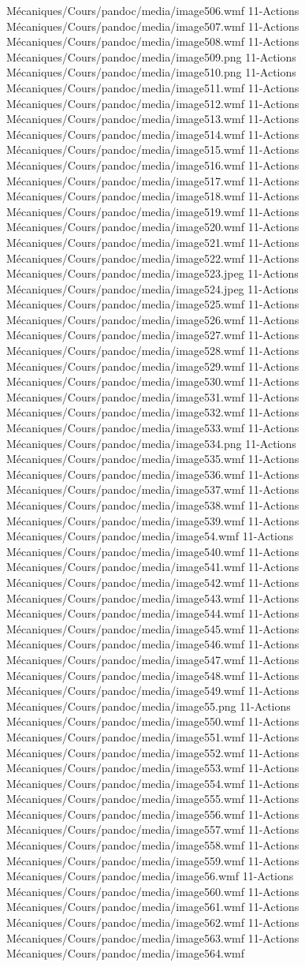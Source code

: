 Mécaniques/Cours/pandoc/media/image506.wmf 11-Actions Mécaniques/Cours/pandoc/media/image507.wmf 11-Actions Mécaniques/Cours/pandoc/media/image508.wmf 11-Actions Mécaniques/Cours/pandoc/media/image509.png 11-Actions Mécaniques/Cours/pandoc/media/image510.png 11-Actions Mécaniques/Cours/pandoc/media/image511.wmf 11-Actions Mécaniques/Cours/pandoc/media/image512.wmf 11-Actions Mécaniques/Cours/pandoc/media/image513.wmf 11-Actions Mécaniques/Cours/pandoc/media/image514.wmf 11-Actions Mécaniques/Cours/pandoc/media/image515.wmf 11-Actions Mécaniques/Cours/pandoc/media/image516.wmf 11-Actions Mécaniques/Cours/pandoc/media/image517.wmf 11-Actions Mécaniques/Cours/pandoc/media/image518.wmf 11-Actions Mécaniques/Cours/pandoc/media/image519.wmf 11-Actions Mécaniques/Cours/pandoc/media/image520.wmf 11-Actions Mécaniques/Cours/pandoc/media/image521.wmf 11-Actions Mécaniques/Cours/pandoc/media/image522.wmf 11-Actions Mécaniques/Cours/pandoc/media/image523.jpeg 11-Actions Mécaniques/Cours/pandoc/media/image524.jpeg 11-Actions Mécaniques/Cours/pandoc/media/image525.wmf 11-Actions Mécaniques/Cours/pandoc/media/image526.wmf 11-Actions Mécaniques/Cours/pandoc/media/image527.wmf 11-Actions Mécaniques/Cours/pandoc/media/image528.wmf 11-Actions Mécaniques/Cours/pandoc/media/image529.wmf 11-Actions Mécaniques/Cours/pandoc/media/image530.wmf 11-Actions Mécaniques/Cours/pandoc/media/image531.wmf 11-Actions Mécaniques/Cours/pandoc/media/image532.wmf 11-Actions Mécaniques/Cours/pandoc/media/image533.wmf 11-Actions Mécaniques/Cours/pandoc/media/image534.png 11-Actions Mécaniques/Cours/pandoc/media/image535.wmf 11-Actions Mécaniques/Cours/pandoc/media/image536.wmf 11-Actions Mécaniques/Cours/pandoc/media/image537.wmf 11-Actions Mécaniques/Cours/pandoc/media/image538.wmf 11-Actions Mécaniques/Cours/pandoc/media/image539.wmf 11-Actions Mécaniques/Cours/pandoc/media/image54.wmf 11-Actions Mécaniques/Cours/pandoc/media/image540.wmf 11-Actions Mécaniques/Cours/pandoc/media/image541.wmf 11-Actions Mécaniques/Cours/pandoc/media/image542.wmf 11-Actions Mécaniques/Cours/pandoc/media/image543.wmf 11-Actions Mécaniques/Cours/pandoc/media/image544.wmf 11-Actions Mécaniques/Cours/pandoc/media/image545.wmf 11-Actions Mécaniques/Cours/pandoc/media/image546.wmf 11-Actions Mécaniques/Cours/pandoc/media/image547.wmf 11-Actions Mécaniques/Cours/pandoc/media/image548.wmf 11-Actions Mécaniques/Cours/pandoc/media/image549.wmf 11-Actions Mécaniques/Cours/pandoc/media/image55.png 11-Actions Mécaniques/Cours/pandoc/media/image550.wmf 11-Actions Mécaniques/Cours/pandoc/media/image551.wmf 11-Actions Mécaniques/Cours/pandoc/media/image552.wmf 11-Actions Mécaniques/Cours/pandoc/media/image553.wmf 11-Actions Mécaniques/Cours/pandoc/media/image554.wmf 11-Actions Mécaniques/Cours/pandoc/media/image555.wmf 11-Actions Mécaniques/Cours/pandoc/media/image556.wmf 11-Actions Mécaniques/Cours/pandoc/media/image557.wmf 11-Actions Mécaniques/Cours/pandoc/media/image558.wmf 11-Actions Mécaniques/Cours/pandoc/media/image559.wmf 11-Actions Mécaniques/Cours/pandoc/media/image56.wmf 11-Actions Mécaniques/Cours/pandoc/media/image560.wmf 11-Actions Mécaniques/Cours/pandoc/media/image561.wmf 11-Actions Mécaniques/Cours/pandoc/media/image562.wmf 11-Actions Mécaniques/Cours/pandoc/media/image563.wmf 11-Actions Mécaniques/Cours/pandoc/media/image564.wmf 
